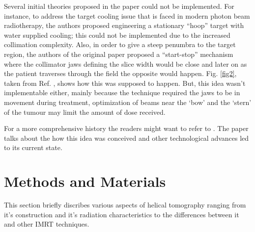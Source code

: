 \documentclass[10pt,journal,compsoc]{IEEEtran} %
\begin{document}
  Several initial theories proposed in the paper could not be implemented. For 
  instance, to address the target cooling issue that is faced in modern photon 
  beam radiotherapy, the authors proposed engineering a stationary ``hoop'' 
  target with water supplied cooling; this could not be implemented due to the 
  increased collimation complexity. Also, in order to give a steep penumbra to 
  the target region, the authors of the original paper proposed a 
  ``start-stop'' mechanism where the collimator jaws defining the slice width 
  would be 
  close and later on as the patient traverses through the field the opposite 
  would happen. Fig. \ref{fig2}, taken from Ref. \cite{Mackie1993}, shows how 
  this was supposed to happen. But, this idea wasn't implementable either, 
  mainly because the technique required the jaws to be in movement during 
  treatment, optimization of beams near the ‘bow’ and the ‘stern’ of the 
  tumour may limit the amount of dose received.  
  
  For a more comprehensive history the readers might want to refer to 
  \cite{Mackie2006}. The paper talks about the how this idea was 
  conceived and other technological advances led to its current state.
  
  \section{Methods and Materials}
  \label{methods}
  This section briefly discribes various aspects of helical tomography ranging 
  from it's construction and it's radiation characteristics to the differences 
  between it and other IMRT techniques.
  
\end{document}
